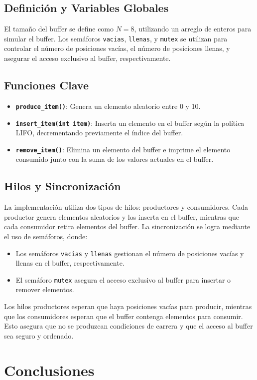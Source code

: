\documentclass[twocolumn]{article}
\begin{document}
\subsection{Definición y Variables Globales}

El tamaño del buffer se define como $N = 8$, utilizando un arreglo de enteros para simular el buffer. Los semáforos \texttt{vacias}, \texttt{llenas}, y \texttt{mutex} se utilizan para controlar el número de posiciones vacías, el número de posiciones llenas, y asegurar el acceso exclusivo al buffer, respectivamente.

\subsection{Funciones Clave}

\begin{itemize}
    \item \textbf{\texttt{produce\_item()}}: Genera un elemento aleatorio entre 0 y 10.
    \item \textbf{\texttt{insert\_item(int item)}}: Inserta un elemento en el buffer según la política LIFO, decrementando previamente el índice del buffer.
    \item \textbf{\texttt{remove\_item()}}: Elimina un elemento del buffer e imprime el elemento consumido junto con la suma de los valores actuales en el buffer.
\end{itemize}

\subsection{Hilos y Sincronización}

La implementación utiliza dos tipos de hilos: productores y consumidores. Cada productor genera elementos aleatorios y los inserta en el buffer, mientras que cada consumidor retira elementos del buffer. La sincronización se logra mediante el uso de semáforos, donde:

\begin{itemize}
    \item Los semáforos \texttt{vacias} y \texttt{llenas} gestionan el número de posiciones vacías y llenas en el buffer, respectivamente.
    \item El semáforo \texttt{mutex} asegura el acceso exclusivo al buffer para insertar o remover elementos.
\end{itemize}

Los hilos productores esperan que haya posiciones vacías para producir, mientras que los consumidores esperan que el buffer contenga elementos para consumir. Esto asegura que no se produzcan condiciones de carrera y que el acceso al buffer sea seguro y ordenado.


\section{Conclusiones}
\lipsum[7-8] %
\end{document}
